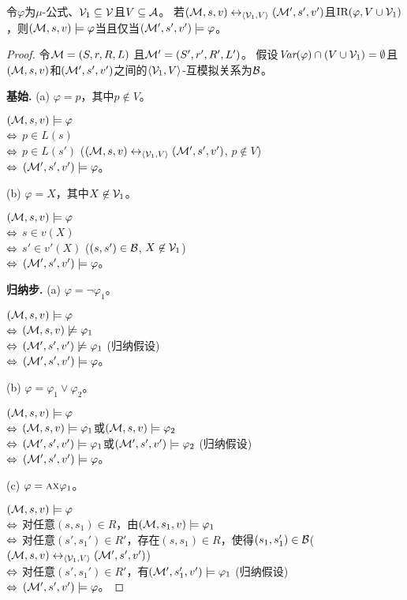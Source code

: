 \begin{proposition}[不变性]
	\label{pro:variB}
	令$\varphi$为$\mu$-公式、${\cal V}_1\subseteq {\cal V}$且$V\subseteq {\cal A}$。 若$({\cal M}, s, v) \leftrightarrow_{{\langle{{\cal V}_1, V}\rangle}} ({\cal M}', s', v')$且$\textrm{IR}(\varphi, V \cup {\cal V}_1)$，则$({\cal M},s, v) \models \varphi$当且仅当$({\cal M}',s', v') \models \varphi$。
\end{proposition}
\begin{proof}
	令${\cal M}=(S,r,R,L)$ 且${\cal M}'=(S',r',R',L')$。
假设$\textit{Var}(\varphi) \cap (V\cup {\cal V}_1) = \emptyset$且$({\cal M}, s, v)$和$({\cal M}', s', v')$之间的${{\langle{{\cal V}_1, V}\rangle}}$-互模拟关系为${\cal B}$。
	
	\textbf{基始.} (a) $\varphi = p$，其中$p\not \in V$。
	
	$({\cal M},s,v) \models \varphi$\\
	$\Leftrightarrow$ $p \in L(s)$ \\
	$\Leftrightarrow$ $p\in L(s')$ \hfill ($({\cal M}, s, v) \leftrightarrow_{{\langle{{\cal V}_1, V}\rangle}} ({\cal M}', s', v')$, $p \not \in V$)\\
	$\Leftrightarrow$ $({\cal M}',s',v') \models \varphi$。
	
	(b) $\varphi = X$，其中$X \not \in {\cal V}_1$。
	
	$({\cal M},s, v)\models \varphi$ \\
	$\Leftrightarrow$ $s \in v(X)$ \\
	$\Leftrightarrow$ $s' \in v'(X)$ \hfill ($(s,s')\in {\cal B}$, $X\not \in {\cal V}_1$)\\
	$\Leftrightarrow$ $({\cal M}',s',v') \models \varphi$。
	
	\textbf{归纳步.} (a) $\varphi = \neg \varphi_1$。
	
	$({\cal M},s,v) \models \varphi$\\
	$\Leftrightarrow$ $({\cal M},s,v) \not \models \varphi_1$\\
	$\Leftrightarrow$ $({\cal M}',s',v') \not \models \varphi_1$ \hfill (归纳假设)\\
	$\Leftrightarrow$ $({\cal M}',s',v') \models \varphi$。
	
	(b) $\varphi = \varphi_1 \vee \varphi_2$。
	
	$({\cal M},s,v) \models \varphi$\\
	$\Leftrightarrow$ $({\cal M},s,v) \models \varphi_1$或$({\cal M},s,v)\models \varphi_2$ \\
	$\Leftrightarrow$ $({\cal M}',s',v') \models \varphi_1$或$({\cal M}',s',v') \models \varphi_2$ \hfill (归纳假设)\\
	$\Leftrightarrow$ $({\cal M}',s',v')\models \varphi$。
	
	(c)  $\varphi = \textsc{a}\textsc{x} \varphi_1$。
	
	$({\cal M},s,v) \models \varphi$\\
	$\Leftrightarrow$ 对任意$(s, s_1)\in R$，由$({\cal M},s_1,v) \models \varphi_1$\\
	$\Leftrightarrow$ 对任意$(s',s_1') \in R'$，存在$(s,s_1) \in R$，使得$(s_1,s_1') \in {\cal B}$\hfill ($({\cal M}, s, v) \leftrightarrow_{{\langle{{\cal V}_1, V}\rangle}} ({\cal M}', s', v')$)\\
	$\Leftrightarrow$ 对任意$(s',s_1') \in R'$，有$({\cal M}',s_1',v')\models \varphi_1$  \hfill (归纳假设)\\
	$\Leftrightarrow$ $({\cal M}',s',v')\models \varphi$。
	

\end{proof}
